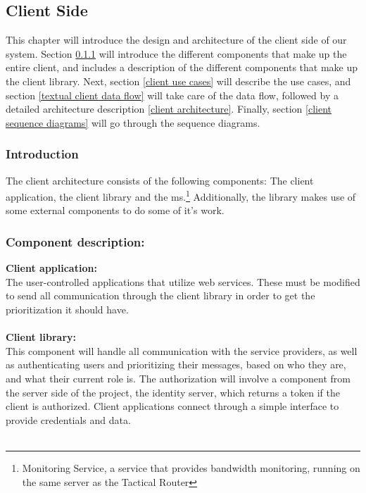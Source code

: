 \subsection{Client Side}\label{client side}

This chapter will introduce the design and architecture of the client side of our system. Section \ref{client introduction} will introduce the different components that make up the entire client, and includes a description of the different components that make up the client library. Next, section \ref{client use cases} will describe the use cases, and section \ref{textual client data flow} will take care of the data flow, followed by a detailed architecture description \ref{client architecture}. Finally, section \ref{client sequence diagrams} will go through the sequence diagrams.
		
    \subsubsection{Introduction}\label{client introduction}
The client architecture consists of the following components: The client application, the client library and the \gls{ms}.\footnote{Monitoring Service, a service that provides bandwidth monitoring, running on the same server as the Tactical Router} Additionally, the library makes use of some external components to do some of it's work.

    \subsubsection{Component description:}\label{Component description}

\indent \indent \textbf{Client application:}\\
	The user-controlled applications that utilize web services. These must be modified to send all communication through the client library in order to get the prioritization it should have.
\\\\

\indent \textbf{Client library:}\\
This component will handle all communication with the service providers, as well as authenticating users and prioritizing their messages, based on who they are, and what their current role is. The authorization will involve a component from the server side of the project, the identity server, which returns a token if the client is authorized. Client applications connect through a simple interface to provide credentials and data.
\\\\

